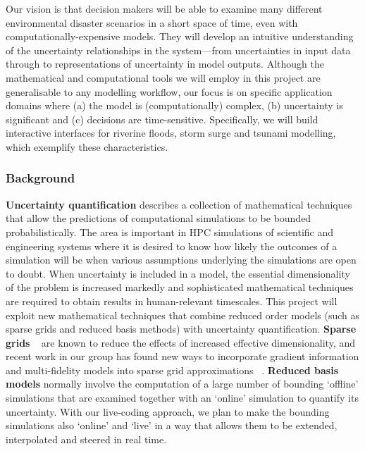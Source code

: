 Our vision is that decision makers will be able
to examine many different environmental disaster scenarios in a short
space of time, even with computationally-expensive models. They will 
develop an intuitive understanding of the uncertainty
relationships in the system---from uncertainties in input data through
to representations of uncertainty in model outputs. 
Although the mathematical and computational tools we will employ in
this project are generalisable to any modelling workflow, our focus is
on specific application domains where (a) the model is
(computationally) complex, (b) uncertainty is significant and (c)
decisions are time-sensitive. Specifically, we will build interactive
interfaces for riverine floods, storm surge and tsunami modelling,
which exemplify these characteristics.
\fi


\subsubsection*{Background}

{\bf Uncertainty quantification} describes a collection of
mathematical techniques that allow the predictions of computational
simulations to be bounded probabilistically. The area is important in
HPC simulations of scientific and
engineering systems where it is desired to know how likely the
outcomes of a simulation will be when various assumptions underlying
the simulations are open to doubt. When uncertainty is included in a
model, the essential dimensionality of the problem is increased
markedly and sophisticated mathematical techniques are required
to obtain results in human-relevant timescales.
This project will exploit new mathematical techniques that
combine {reduced order models} (such as {sparse grids and reduced
basis methods}) with uncertainty quantification. {\bf Sparse grids}
~\parencite{BungartzGriebel2004} are known to reduce the effects of
increased effective dimensionality,
and recent work in our group has found new
ways to incorporate gradient information and multi-fidelity models
into sparse grid approximations
~\parencite{deBaarHarding2015,Jakeman2015,deBaarRDM2015}.  {\bf Reduced
basis models} normally involve the computation of a large number of bounding
`offline' simulations that are examined together with an `online'
simulation to quantify its uncertainty. With our live-coding approach,
we plan to make the bounding simulations 
also  `online' and `live' in a way that allows them to be extended, 
interpolated and steered in real time.

